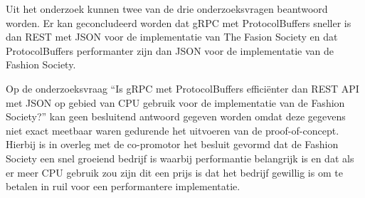 Uit het onderzoek kunnen twee van de drie onderzoeksvragen beantwoord worden. Er kan geconcludeerd worden dat gRPC met ProtocolBuffers sneller is dan REST met JSON voor de implementatie van The Fasion Society en dat ProtocolBuffers performanter zijn dan JSON voor de implementatie van de Fashion Society.

Op de onderzoeksvraag “Is gRPC met ProtocolBuffers efficiënter dan REST API met JSON op gebied van CPU gebruik voor de implementatie van de Fashion Society?” kan geen besluitend antwoord gegeven worden omdat deze gegevens niet exact meetbaar waren gedurende het uitvoeren van de proof-of-concept. Hierbij is in overleg met de co-promotor het besluit gevormd dat de Fashion Society een snel groeiend bedrijf is waarbij performantie belangrijk is en dat als er meer CPU gebruik zou zijn dit een prijs is dat het bedrijf gewillig is om te betalen in ruil voor een performantere implementatie.





